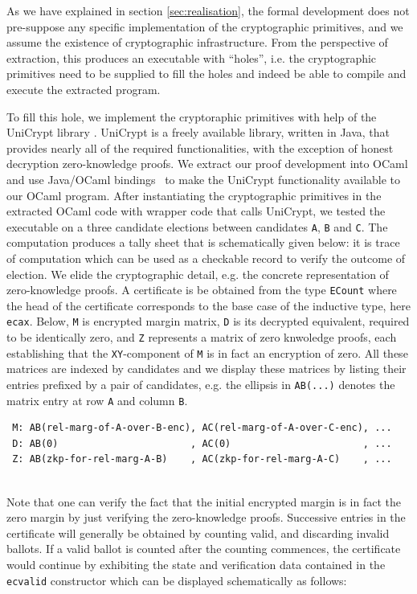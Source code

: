 As we have explained in section \ref{sec:realisation}, the formal
development does not pre-suppose any specific implementation of the
cryptographic primitives, and we assume the existence of
cryptographic infrastructure. From the perspective of extraction,
this produces an executable with ``holes'', i.e. the cryptographic
primitives need to be supplied to fill the holes and indeed be able
to compile and execute the extracted program.  

To fill this hole, we implement the cryptoraphic primitives with
help of the UniCrypt library \citep{LocherH14}.
UniCrypt is a freely available library, written in Java,  that provides nearly all of
the required functionalities, with the exception of honest decryption
zero-knowledge proofs.  We extract our proof development into OCaml
and use Java/OCaml bindings~\citep{OCamlJava} to make the UniCrypt
functionality available to our OCaml program.  
After instantiating the  
 cryptographic primitives in the extracted OCaml code with wrapper
 code that calls UniCrypt,
 we tested the executable on a three candidate elections between
 candidates \texttt{A}, \texttt{B} and \texttt{C}.
 The computation produces a tally sheet that is schematically given
 below:
 it is trace of computation which can be used as a checkable record to verify
 the outcome of election. We elide the cryptographic detail, e.g.
 the concrete representation of zero-knowledge proofs.
 A certificate
 is be obtained from the type \texttt{ECount} where the head
 of the certificate corresponds to the base case of the inductive
 type, here \texttt{ecax}. Below, \texttt{M} is encrypted margin
 matrix, \texttt{D} is its decrypted equivalent, required to be
 identically zero, and \texttt{Z} represents a matrix of zero
 knwoledge proofs, each establishing that the \texttt{XY}-component
 of \texttt{M} is in fact an encryption of zero. All these matrices
 are indexed by candidates and we display these matrices by listing
 their entries prefixed by a pair of candidates, e.g. the ellipsis
 in \texttt{AB(...)} denotes the matrix entry at row \texttt{A} and
 column \texttt{B}.

 {\small
 \begin{verbatim}
 M: AB(rel-marg-of-A-over-B-enc), AC(rel-marg-of-A-over-C-enc), ... 
 D: AB(0)                       , AC(0)                       , ...
 Z: AB(zkp-for-rel-marg-A-B)    , AC(zkp-for-rel-marg-A-C)    , ...
 \end{verbatim}}
 
 \mbox{}\\[-5ex]
 Note that one can verify the fact that the initial encrypted margin
 is in fact the zero margin by just verifying the zero-knowledge
 proofs. Successive entries in the certificate will generally be
 obtained by counting valid, and discarding invalid ballots. If a
 valid ballot is counted after the counting commences, the
 certificate would continue by exhibiting the state and verification
 data contained in the \texttt{ecvalid} constructor which can be
 displayed schematically as follows:

